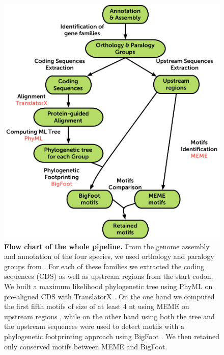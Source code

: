 \documentclass[10pt]{article}
\begin{document}
\begin{figure}[!ht]
\begin{center}
\includegraphics{Figures/Pipeline.png}
\end{center}
\caption{
{\bf Flow chart of the whole pipeline.}  From the genome assembly and annotation of the four species, we used orthology and paralogy groups from \citep{mcgrath_insights_2014}. For each of these families we extracted the coding sequences (CDS) as well as upstream regions from the start codon. We built a maximum likelihood phylogenetic tree using PhyML on pre-aligned CDS with TranslatorX \citep{abascal_translatorx:_2010}. On the one hand we computed the first fifth motifs of size of at least 4 nt using MEME on upstream regions \citep{bailey_meme:_2006}, while on the other hand using both the tree and the upstream sequences were used to detect motifs with a phylogenetic footprinting approach using BigFoot \citep{satija_bigfoot:_2009}. We then retained only conserved motifs between MEME and BigFoot.
}
\label{fig:Pipeline}
\end{figure}
\end{document}
